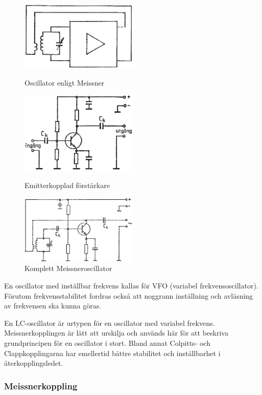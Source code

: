 \begin{figure}
  \includegraphics[width=0.5\textwidth]{images/cropped_pdfs/bild_2_3-66.pdf}
  \caption{Oscillator enligt Meissner}
  \label{fig:BildII3-66}

  \includegraphics[width=0.5\textwidth]{images/cropped_pdfs/bild_2_3-67.pdf}
  \caption{Emitterkopplad förstärkare}
  \label{fig:BildII3-67}

  \includegraphics[width=0.5\textwidth]{images/cropped_pdfs/bild_2_3-68.pdf}
  \caption{Komplett Meissneroscillator}
  \label{fig:BildII3-68}
\end{figure}

En oscillator med inställbar frekvens kallas för VFO (variabel
frekvensoscillator).
Förutom frekvensstabilitet fordras också att noggrann inställning och
avläsning av frekvensen ska kunna göras.

En LC-oscillator är urtypen för en oscillator med variabel frekvens.
Meissnerkopplingen är lätt att urskilja och används här för att beskriva
grundprincipen för en oscillator i stort.
Bland annat Colpitts- och Clappkopplingarna har emellertid bättre stabilitet
och inställbarhet i återkopplingsledet.

\subsubsection{Meissnerkoppling}

